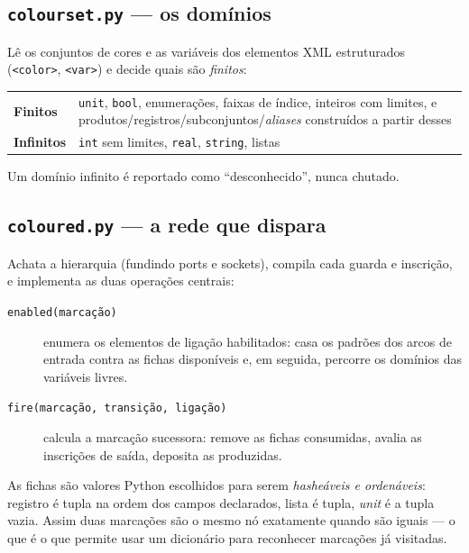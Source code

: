 \documentclass[11pt,a4paper]{report}
\newcommand{\code}[1]{\texttt{\small #1}}
\begin{document}
\subsection{\code{colourset.py} --- os domínios}

Lê os conjuntos de cores e as variáveis dos elementos XML estruturados
(\code{<color>}, \code{<var>}) e decide quais são \emph{finitos}:

\begin{center}
\begin{tabular}{@{}lp{10.2cm}@{}}
\toprule
\textbf{Finitos} & \code{unit}, \code{bool}, enumerações, faixas de índice, inteiros com limites, e produtos/registros/subconjuntos/\emph{aliases} construídos a partir desses \\
\textbf{Infinitos} & \code{int} sem limites, \code{real}, \code{string}, listas \\
\bottomrule
\end{tabular}
\end{center}

Um domínio infinito é reportado como ``desconhecido'', nunca chutado.

\subsection{\code{coloured.py} --- a rede que dispara}

Achata a hierarquia (fundindo ports e sockets), compila cada guarda e
inscrição, e implementa as duas operações centrais:

\begin{description}
  \item[\code{enabled(marcação)}] enumera os elementos de ligação habilitados:
        casa os padrões dos arcos de entrada contra as fichas disponíveis e,
        em seguida, percorre os domínios das variáveis livres.
  \item[\code{fire(marcação, transição, ligação)}] calcula a marcação sucessora:
        remove as fichas consumidas, avalia as inscrições de saída, deposita
        as produzidas.
\end{description}

As fichas são valores Python escolhidos para serem \emph{hasheáveis e
ordenáveis}: registro é tupla na ordem dos campos declarados, lista é tupla,
\emph{unit} é a tupla vazia. Assim duas marcações são o mesmo nó exatamente
quando são iguais --- o que é o que permite usar um dicionário para
reconhecer marcações já visitadas.
\end{document}
